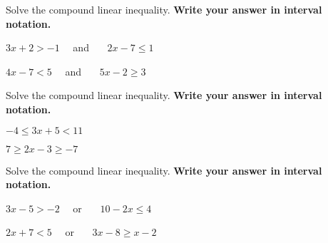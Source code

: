 \begin{exercise}
	Solve the compound linear inequality. \textbf{Write your answer in interval notation.}

	\noindent
	\begin{enumerate*}[label=\textup{(\arabic*)~}]
		\item  $3x+2>-1$ ~~and~~~ $2x-7\leq 1$
		\item  $4x -7< 5 $ ~~and~~~ $5x-2\geq 3$
		\hfill\null
	\end{enumerate*}
\end{exercise}

\vfill

\begin{center}\hfill
	\raisebox{0.4em}{
		\rotatebox{\rotationdegree}{
			\parbox{\textwidth}{
				\begin{enumerate*}[label={\theexer~(\arabic*)~}]
					\item  $(-1, 4]$
					\item  $[1, 3) $\hfill\null
				\end{enumerate*}
			}
		}
	}
\end{center}

\newpage

\begin{exercise}
	Solve the compound linear inequality. \textbf{Write your answer in interval notation.}

	\noindent
	\begin{enumerate*}[label=\textup{(\arabic*)~}]
		\item  $-4\leq 3x+5<11$
		\item  $7\geq 2x-3\geq -7$
		\hfill\null
	\end{enumerate*}
\end{exercise}

\vfill

\begin{center}\hfill
	\raisebox{0.4em}{
		\rotatebox{\rotationdegree}{
			\parbox{\textwidth}{
				\begin{enumerate*}[label={\theexer~(\arabic*)~}]
					\item  $[-3, 2)$
					\item  $[-2, 5] $\hfill\null
				\end{enumerate*}
			}
		}
	}
\end{center}




\begin{exercise}
	Solve the compound linear inequality. \textbf{Write your answer in interval notation.}

	\noindent
	\begin{enumerate*}[label=\textup{(\arabic*)~}]
		\item  $3x-5>-2$ ~~or~~~ $10-2x\leq 4$
		\item  $2x + 7<5 $ ~~or~~~ $3x-8\geq x-2$
		\hfill\null
	\end{enumerate*}
\end{exercise}

